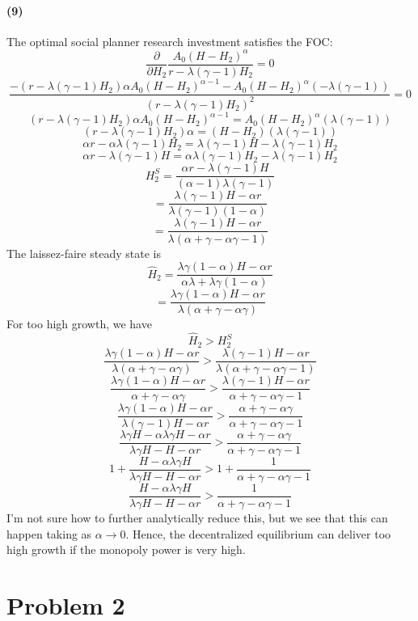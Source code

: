 \documentclass[10pt,letter]{article}
\newcommand{\problem}[1]{\section*{Problem #1}}
\newcommand{\problempart}[1]{\paragraph{#1}}
\begin{document}
\problempart{(9)}
The optimal social planner research investment satisfies the FOC:
\[ \frac{\partial }{\partial H_2} \frac{A_0(H - H_2)^\alpha }{r - \lambda(\gamma-1)H_2}  = 0\]
\[  \frac{-(r - \lambda(\gamma-1)H_2) \alpha A_0(H - H_2)^{\alpha -1 } - A_0(H - H_2)^\alpha(- \lambda(\gamma-1))}{(r - \lambda(\gamma-1)H_2)^2}  = 0\]
\[ (r - \lambda(\gamma-1)H_2) \alpha A_0(H - H_2)^{\alpha -1 } = A_0(H - H_2)^\alpha(\lambda(\gamma-1))\]
\[ (r - \lambda(\gamma-1)H_2) \alpha  = (H - H_2)(\lambda(\gamma-1))\]
\[ \alpha r - \alpha \lambda(\gamma-1)H_2  = \lambda(\gamma-1)H - \lambda(\gamma-1)H_2\]
\[ \alpha r - \lambda(\gamma-1)H  = \alpha \lambda(\gamma-1)H_2  - \lambda(\gamma-1)H_2\]
\[ H_2^S = \frac{\alpha r - \lambda(\gamma-1)H}{(\alpha-1) \lambda(\gamma-1) } \]
\[ = \frac{ \lambda(\gamma-1)H - \alpha r}{ \lambda(\gamma-1)(1-\alpha) } \]
\[ =  \frac{ \lambda(\gamma-1)H - \alpha r}{ \lambda(\alpha+\gamma - \alpha\gamma - 1) }\]
The laissez-faire steady state is
\[ \hat{H}_2 = \frac{\lambda\gamma (1-\alpha) H - \alpha r}{\alpha \lambda  + \lambda\gamma (1-\alpha)} \]
\[ = \frac{\lambda\gamma (1-\alpha) H - \alpha r}{\lambda\left( \alpha  + \gamma -\alpha\gamma\right)} \]
For too high growth, we have
\[ \hat{H}_2 > H_2^S \]
\[ \frac{\lambda\gamma (1-\alpha) H - \alpha r}{\lambda\left( \alpha  + \gamma -\alpha\gamma\right)} > \frac{ \lambda(\gamma-1)H - \alpha r}{ \lambda(\alpha+\gamma - \alpha\gamma - 1) } \]
\[ \frac{\lambda\gamma (1-\alpha) H - \alpha r}{\alpha  + \gamma -\alpha\gamma} > \frac{ \lambda(\gamma-1)H - \alpha r}{ \alpha+\gamma - \alpha\gamma - 1 } \]
\[ \frac{\lambda\gamma (1-\alpha) H - \alpha r}{ \lambda(\gamma-1)H - \alpha r} > \frac{\alpha  + \gamma -\alpha\gamma}{ \alpha+\gamma - \alpha\gamma - 1 } \]
\[ \frac{\lambda\gamma H -\alpha\lambda\gamma H - \alpha r}{ \lambda \gamma H-H - \alpha r} > \frac{\alpha  + \gamma -\alpha\gamma}{ \alpha+\gamma - \alpha\gamma - 1 } \]
\[ 1 + \frac{ H -\alpha\lambda\gamma H }{ \lambda \gamma H-H - \alpha r} > 1 + \frac{1}{ \alpha+\gamma - \alpha\gamma - 1 } \]
\[ \frac{ H -\alpha\lambda\gamma H }{ \lambda \gamma H-H - \alpha r} >  \frac{1}{ \alpha+\gamma - \alpha\gamma - 1 } \]
I'm not sure how to further analytically reduce this, but we see that this can happen taking as $\alpha \to 0$. Hence, the decentralized equilibrium can deliver too high growth if the monopoly power is very high.
\pagebreak
\problem{2}
\end{document}
